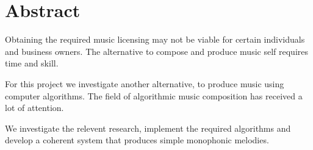 \begingroup
\let\clearpage\relax
\let\cleardoublepage\relax
\let\cleardoublepage\relax

\chapter*{Abstract}
Obtaining the required music licensing may not be viable for certain individuals and business owners. The alternative to compose and produce music self requires time and skill.

For this project we investigate another alternative, to produce music using computer algorithms. 
The field of algorithmic music composition has received a lot of attention.

We investigate the relevent research, implement the required algorithms and develop a coherent system that produces simple monophonic melodies.

\vfill



\endgroup			

\vfill
